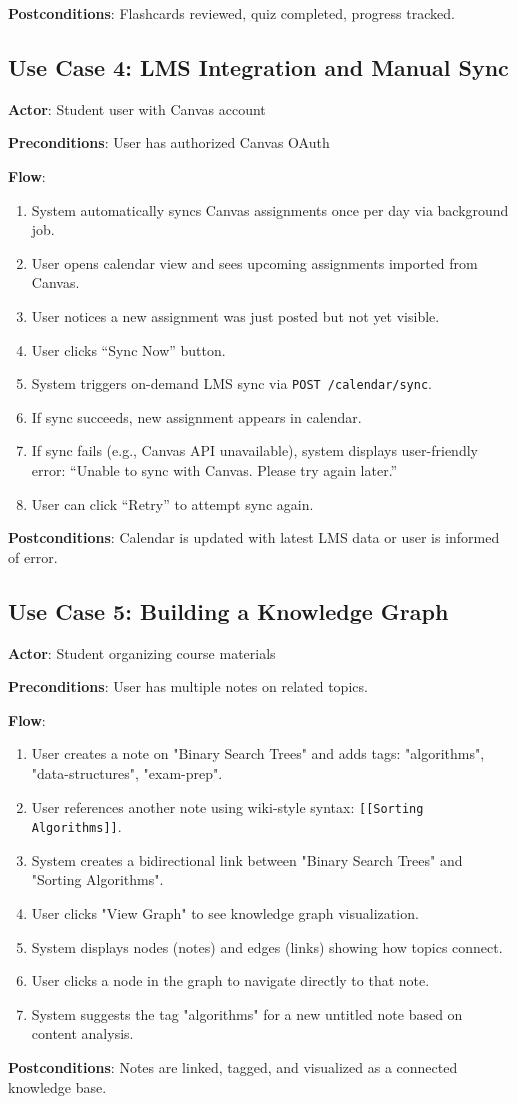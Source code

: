 \documentclass[12pt,a4paper]{article}
\begin{document}
\textbf{Postconditions}: Flashcards reviewed, quiz completed, progress tracked.

\subsection*{Use Case 4: LMS Integration and Manual Sync}

\textbf{Actor}: Student user with Canvas account

\textbf{Preconditions}: User has authorized Canvas OAuth

\textbf{Flow}:
\begin{enumerate}
    \item System automatically syncs Canvas assignments once per day via background job.
    \item User opens calendar view and sees upcoming assignments imported from Canvas.
    \item User notices a new assignment was just posted but not yet visible.
    \item User clicks ``Sync Now'' button.
    \item System triggers on-demand LMS sync via \texttt{POST /calendar/sync}.
    \item If sync succeeds, new assignment appears in calendar.
    \item If sync fails (e.g., Canvas API unavailable), system displays user-friendly error: ``Unable to sync with Canvas. Please try again later.''
    \item User can click ``Retry'' to attempt sync again.
\end{enumerate}

\textbf{Postconditions}: Calendar is updated with latest LMS data or user is informed of error.

\subsection*{Use Case 5: Building a Knowledge Graph}

\textbf{Actor}: Student organizing course materials

\textbf{Preconditions}: User has multiple notes on related topics.

\textbf{Flow}:
\begin{enumerate}
    \item User creates a note on "Binary Search Trees" and adds tags: "algorithms", "data-structures", "exam-prep".
    \item User references another note using wiki-style syntax: \texttt{[[Sorting Algorithms]]}.
    \item System creates a bidirectional link between "Binary Search Trees" and "Sorting Algorithms".
    \item User clicks "View Graph" to see knowledge graph visualization.
    \item System displays nodes (notes) and edges (links) showing how topics connect.
    \item User clicks a node in the graph to navigate directly to that note.
    \item System suggests the tag "algorithms" for a new untitled note based on content analysis.
\end{enumerate}

\textbf{Postconditions}: Notes are linked, tagged, and visualized as a connected knowledge base.
\end{document}
